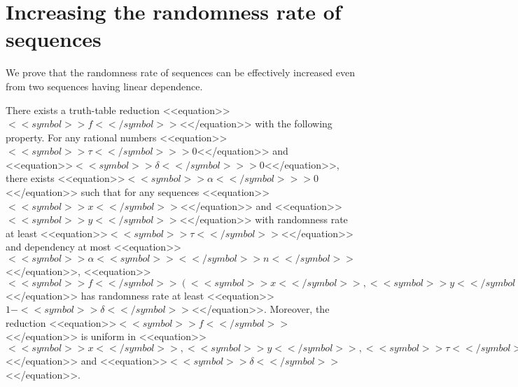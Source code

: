 \documentclass[proceedings]{stacs}
\begin{document}
\section{Increasing the randomness rate of sequences}
We prove that the randomness rate of sequences can be effectively increased even from two sequences having linear dependence.
\begin{theorem}
\label{t:sequences}
There exists a truth-table reduction <<equation>>$<<symbol>>f<</symbol>>$<</equation>> with the following property. For any rational numbers <<equation>>$<<symbol>>\tau <</symbol>>> 0$<</equation>> and <<equation>>$<<symbol>>\delta <</symbol>>>0$<</equation>>, there exists <<equation>>$<<symbol>>\alpha <</symbol>>> 0$<</equation>> such that for any sequences <<equation>>$<<symbol>>x<</symbol>>$<</equation>> and <<equation>>$<<symbol>>y<</symbol>>$<</equation>> with randomness rate at least <<equation>>$<<symbol>>\tau<</symbol>>$<</equation>> and dependency at most <<equation>>$<<symbol>>\alpha <<symbol>><</symbol>>n<</symbol>>$<</equation>>, <<equation>>$<<symbol>>f<</symbol>>(<<symbol>>x<</symbol>>,<<symbol>>y<</symbol>>, <<symbol>>\tau<</symbol>>, <<symbol>>\delta<</symbol>>)$<</equation>> has randomness rate at least <<equation>>$1-<<symbol>>\delta<</symbol>>$<</equation>>. Moreover, the reduction <<equation>>$<<symbol>>f<</symbol>>$<</equation>> is uniform in <<equation>>$<<symbol>>x<</symbol>>,<<symbol>>y<</symbol>>, <<symbol>>\tau<</symbol>>$<</equation>> and <<equation>>$<<symbol>>\delta<</symbol>>$<</equation>>.
\end{theorem}
\end{document}
